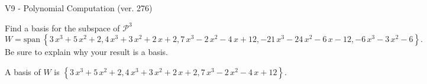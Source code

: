 \begin{exercise}
  \begin{exerciseTitle}V9 - Polynomial Computation (ver. 276)\end{exerciseTitle}
  \begin{exerciseStatement}
    Find a basis for the subspace of \(\mathcal{P}^3\) 
\[W=\mathrm{span}\ \left\{3 \, x^{3} + 5 \, x^{2} + 2 , 4 \, x^{3} + 3 \, x^{2} + 2 \, x + 2 , 7 \, x^{3} - 2 \, x^{2} - 4 \, x + 12 , -21 \, x^{3} - 24 \, x^{2} - 6 \, x - 12 , -6 \, x^{3} - 3 \, x^{2} - 6\right\}.\]
 Be sure to explain why your result is a basis.


  \end{exerciseStatement}
  \begin{exerciseAnswer}
   A basis of \(W\) is  \(\left\{3 \, x^{3} + 5 \, x^{2} + 2 , 4 \, x^{3} + 3 \, x^{2} + 2 \, x + 2 , 7 \, x^{3} - 2 \, x^{2} - 4 \, x + 12\right\}\).
  


  \end{exerciseAnswer}
\end{exercise}